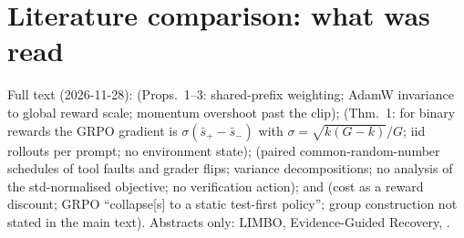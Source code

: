 \section{Literature comparison: what was read}\label{app4:lit}
Full text (2026-11-28): \citet{fontana-etal-2026-hidden} (Props.~1--3: shared-prefix weighting; AdamW invariance to
global reward scale; momentum overshoot past the clip); \citet{bay2026grpodrgrpodapo} (Thm.~1: for binary rewards the
GRPO gradient is $\sigma(\bar s_+-\bar s_-)$ with $\sigma=\sqrt{k(G-k)}/G$; iid rollouts per prompt; no environment
state); \citet{sakib2026luck} (paired common-random-number schedules of tool faults and grader flips; variance
decompositions; no analysis of the std-normalised objective; no verification action); and
\citet{ding2026calibratethenactcostawareexplorationllm} (cost as a reward discount; GRPO ``collapse[s] to a static
test-first policy''; group construction not stated in the main text). Abstracts only: LIMBO, Evidence-Guided Recovery,
\citet{kaynar2026toolsfailagentsfabricate}.

